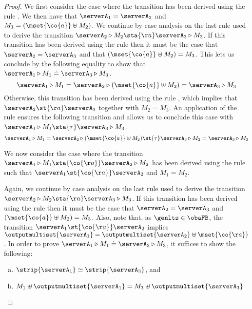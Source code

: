 \begin{proof}
  We first consider the case where the transition has been derived using the rule
  \stmoutlift. We then have that $\serverA_1 = \serverA_2$ and $M_1 =  (\mset{\co{a}} \uplus M_2)$.
  We continue by case analysis on the last rule used to derive the transition
  $\serverA_2 \triangleright M_2  \sta{\aa} \serverA_3 \triangleright M_3$.
  If this transition has been derived using the rule \stminplift then it must be the case that
  $\serverA_2 = \serverA_3$ and that $(\mset{\co{a}} \uplus M_2) = M_3$.
  This lets us conclude by the following equality to show that
  $\serverA_1 \triangleright M_1 \doteq \serverA_3 \triangleright M_3$.
  $$
  \serverA_1 \triangleright M_1
  = \serverA_2 \triangleright (\mset{\co{a}} \uplus M_2)
  = \serverA_3 \triangleright M_3
  $$
  Otherwise, this transition has been derived using the rule \stproclift, which implies that
  $\serverA_2 \st{\aa} \serverA_3$ together with $M_2 = M_3$.
  An application of the rule \stcommlift ensures the following transition and allows us to
  conclude this case with $\serverA_1 \triangleright M_1 \sta{\tau} \serverA_3 \triangleright M_3$.
  $$
  \serverA_1 \triangleright M_1 = \serverA_2 \triangleright (\mset{\co{a}} \uplus M_2) \st{\tau}
  \serverA_3 \triangleright M_2 = \serverA_3 \triangleright M_3
  $$

  We now consider the case where the transition
  $\serverA_1 \triangleright M_1 \sta{\co{\aa}} \serverA_2 \triangleright M_2$ has been
  derived using the rule \stproclift such that
  $\serverA_1 \st{\co{\aa}} \serverA_2$ and $M_1 = M_2$.

  Again, we continue by case analysis on the last rule used to derive the transition
  $\serverA_2 \triangleright M_2  \sta{\aa} \serverA_3 \triangleright M_3$.
  If this transition has been derived using the rule \stminplift then it must be the case that
  $\serverA_2 = \serverA_3$ and $(\mset{\co{a}} \uplus M_2) = M_3$.
  Also, note that, as $\genlts \in \obaFB$, the transition $\serverA_1 \st{\co{\aa}} \serverA_2$
  implies
  $\outputmultiset{\serverA_1} = \outputmultiset{\serverA_2} \uplus \mset{\co{\aa}}$.
  In order to prove $\serverA_1 \triangleright M_1 \doteq \serverA_3 \triangleright M_3$,
  it suffices to show the following:
  \begin{enumerate}[(a)]
  \item $\strip{ \serverA_1 } \simeq \strip{ \serverA_3 }$, and
  \item $M_1 \uplus \outputmultiset{\serverA_1} = M_3 \uplus \outputmultiset{\serverA_3}$
  \end{enumerate}


\end{proof}
